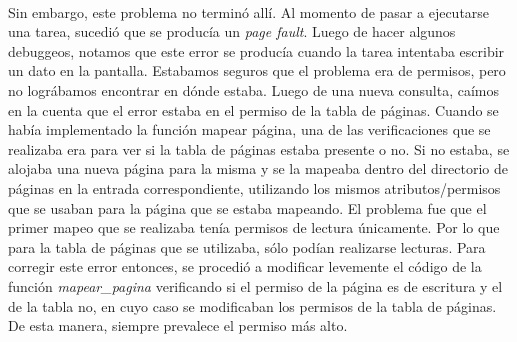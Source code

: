 \documentclass[11pt, a4paper]{article}
\begin{document}
\paragraph{}
Sin embargo, este problema no terminó allí. Al momento de pasar a ejecutarse una tarea, sucedió que se producía un \textit{page fault}. Luego de hacer algunos debuggeos, notamos que este error se producía cuando la tarea intentaba escribir un dato en la pantalla. Estabamos seguros que el problema era de permisos, pero no lográbamos encontrar en dónde estaba. Luego de una nueva consulta, caímos en la cuenta que el error estaba en el permiso de la tabla de páginas. Cuando se había implementado la función mapear página, una de las verificaciones que se realizaba era para ver si la tabla de páginas estaba presente o no. Si no estaba, se alojaba una nueva página para la misma y se la mapeaba dentro del directorio de páginas en la entrada correspondiente, utilizando los mismos atributos/permisos que se usaban para la página que se estaba mapeando. El problema fue que el primer mapeo que se realizaba tenía permisos de lectura únicamente. Por lo que para la tabla de páginas que se utilizaba, sólo podían realizarse lecturas. Para corregir este error entonces, se procedió a modificar levemente el código de la función \textit{mapear\_pagina} verificando si el permiso de la página es de escritura y el de la tabla no, en cuyo caso se modificaban los permisos de la tabla de páginas. De esta manera, siempre prevalece el permiso más alto.
\end{document}
